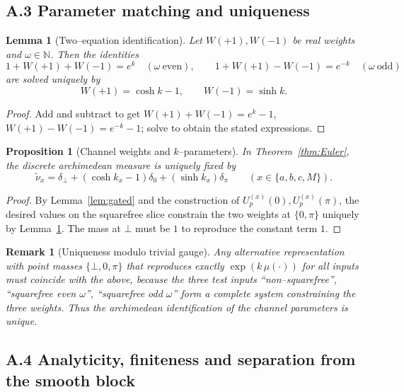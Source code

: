 \documentclass[12pt]{article}
\newtheorem{lemma}[theorem]{Lemma}
\newtheorem{proposition}[theorem]{Proposition}
\newtheorem{remark}[theorem]{Remark}
\numberwithin{equation}{section}
\begin{document}
\bigskip
\subsection*{A.3 \; Parameter matching and uniqueness}

\begin{lemma}[Two–equation identification]\label{lem:weights-two-eq}
Let $W(+1),W(-1)$ be real weights and $\omega\in\mathbb{N}$. Then the identities
\[
1+W(+1)+W(-1)=e^{k}\quad (\omega\ \text{even}),\qquad
1+W(+1)-W(-1)=e^{-k}\quad (\omega\ \text{odd})
\]
are solved uniquely by
\[
W(+1)=\cosh k-1,\qquad W(-1)=\sinh k.
\]
\end{lemma}

\begin{proof}
Add and subtract to get $W(+1)+W(-1)=e^{k}-1$, $W(+1)-W(-1)=e^{-k}-1$; solve to obtain the stated expressions.
\end{proof}

\begin{proposition}[Channel weights and $k$–parameters]\label{prop:mapping}
In Theorem~\ref{thm:Euler}, the discrete archimedean measure is uniquely fixed by
\[
\tilde\nu_x=\delta_{\bot}+(\cosh k_x-1)\delta_{0}+(\sinh k_x)\delta_{\pi}\qquad (x\in\{a,b,c,M\}).
\]
\end{proposition}

\begin{proof}
By Lemma~\ref{lem:gated} and the construction of $U^{(x)}_p(0),U^{(x)}_p(\pi)$, the desired values on the squarefree slice constrain the two weights at $\{0,\pi\}$ uniquely by Lemma~\ref{lem:weights-two-eq}. The mass at $\bot$ must be $1$ to reproduce the constant term $1$.
\end{proof}

\begin{remark}[Uniqueness modulo trivial gauge]
Any alternative representation with point masses $\{\bot,0,\pi\}$ that reproduces exactly $\exp(k\,\mu(\cdot))$ for all inputs must coincide with the above, because the three test inputs ``non–squarefree'', ``squarefree even $\omega$'', ``squarefree odd $\omega$'' form a complete system constraining the three weights. Thus the archimedean identification of the channel parameters is unique.
\end{remark}

\bigskip
\subsection*{A.4 \; Analyticity, finiteness and separation from the smooth block}
\end{document}
